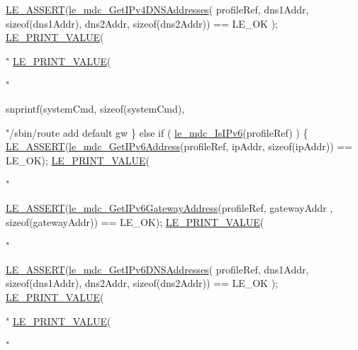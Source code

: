 \begin{DoxyCodeInclude}
{{        \hyperlink{le__log_8h_ac0dbbef91dc0fed449d0092ff0557b39}{LE\_ASSERT}(\hyperlink{le__mdc__interface_8h_a0dd0dcf60d647388fa3e1973917a6161}{le\_mdc\_GetIPv4DNSAddresses}( profileRef,
                                              dns1Addr, \textcolor{keyword}{sizeof}(dns1Addr),
                                              dns2Addr, \textcolor{keyword}{sizeof}(dns2Addr)) == LE\_OK );
        \hyperlink{le__print_8h_a1a6709c55d8d08c496846ba2295138b7}{LE\_PRINT\_VALUE}(\textcolor{stringliteral}{"%
        \hyperlink{le__print_8h_a1a6709c55d8d08c496846ba2295138b7}{LE\_PRINT\_VALUE}(\textcolor{stringliteral}{"%

        snprintf(systemCmd, \textcolor{keyword}{sizeof}(systemCmd), \textcolor{stringliteral}{"/sbin/route add default gw %
    \}
    \textcolor{keywordflow}{else} \textcolor{keywordflow}{if} ( \hyperlink{le__mdc__interface_8h_adde11de0b17b2c937acca6355b6fba11}{le\_mdc\_IsIPv6}(profileRef) )
    \{
        \hyperlink{le__log_8h_ac0dbbef91dc0fed449d0092ff0557b39}{LE\_ASSERT}(\hyperlink{le__mdc__interface_8h_a73ef38d4d2399580d552b12c62f1c508}{le\_mdc\_GetIPv6Address}(profileRef, ipAddr, \textcolor{keyword}{sizeof}(ipAddr)) 
      == LE\_OK);
        \hyperlink{le__print_8h_a1a6709c55d8d08c496846ba2295138b7}{LE\_PRINT\_VALUE}(\textcolor{stringliteral}{"%

        \hyperlink{le__log_8h_ac0dbbef91dc0fed449d0092ff0557b39}{LE\_ASSERT}(\hyperlink{le__mdc__interface_8h_a3bb60671304e2b4d3b23d8e623f9940c}{le\_mdc\_GetIPv6GatewayAddress}(profileRef, gatewayAddr
      , \textcolor{keyword}{sizeof}(gatewayAddr))
                                                                                          == LE\_OK);
        \hyperlink{le__print_8h_a1a6709c55d8d08c496846ba2295138b7}{LE\_PRINT\_VALUE}(\textcolor{stringliteral}{"%

        \hyperlink{le__log_8h_ac0dbbef91dc0fed449d0092ff0557b39}{LE\_ASSERT}(\hyperlink{le__mdc__interface_8h_ad9cb7d3299620d9dcde551cec45389a1}{le\_mdc\_GetIPv6DNSAddresses}( profileRef,
                                              dns1Addr, \textcolor{keyword}{sizeof}(dns1Addr),
                                              dns2Addr, \textcolor{keyword}{sizeof}(dns2Addr)) == LE\_OK );
        \hyperlink{le__print_8h_a1a6709c55d8d08c496846ba2295138b7}{LE\_PRINT\_VALUE}(\textcolor{stringliteral}{"%
        \hyperlink{le__print_8h_a1a6709c55d8d08c496846ba2295138b7}{LE\_PRINT\_VALUE}(\textcolor{stringliteral}{"%

}}}}}}}}}
\end{DoxyCodeInclude}
